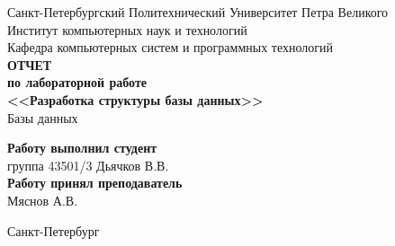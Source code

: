\begin{titlepage}
\begin{center}
	Санкт-Петербургский Политехнический Университет Петра Великого\\[0.3cm]
	Институт компьютерных наук и технологий \\[0.3cm]
	Кафедра компьютерных систем и программных технологий\\[4cm]
	
	\textbf{ОТЧЕТ}\\ 
	\textbf{по лабораторной работе}\\[0.5cm]
	\textbf{<<Разработка структуры базы данных>>}\\[0.1cm]
	Базы данных\\[3.0cm]
\end{center}

\begin{flushright}
	\begin{minipage}{0.45\textwidth}
		\textbf{Работу выполнил студент}\\[3mm]
		группа 43501/3 \hfill Дьячков В.В.\\[5mm]
		\textbf{Работу принял преподаватель}\\[5mm]
		\sign[3cm] \hfill Мяснов А.В. \\[5mm]
	\end{minipage}
\end{flushright}

\vfill

\begin{center}
	Санкт-Петербург\\[0.3cm]
	\the\year
\end{center}
\end{titlepage}

\addtocounter{page}{1}
